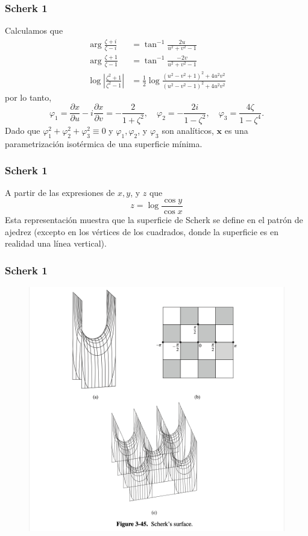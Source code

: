 \documentclass[10pt]{beamer}
\begin{document}
\begin{frame}
  \frametitle{Scherk 1}

Calculamos que
$$
\begin{aligned}
\arg \frac{\zeta+i}{\zeta-i} & =\tan ^{-1} \frac{2 u}{u^2+v^2-1} \\
\arg \frac{\zeta+1}{\zeta-1} & =\tan ^{-1} \frac{-2 v}{u^2+v^2-1} \\
\log \left|\frac{\zeta^2+1}{\zeta^2-1}\right| & =\frac{1}{2} \log \frac{\left(u^2-v^2+1\right)^2+4 u^2 v^2}{\left(u^2-v^2-1\right)^2+4 u^2 v^2}
\end{aligned}
$$
por lo tanto,
$$
\varphi_1=\frac{\partial x}{\partial u}-i \frac{\partial x}{\partial v}=-\frac{2}{1+\zeta^2}, \quad \varphi_2=-\frac{2 i}{1-\zeta^2}, \quad \varphi_3=\frac{4 \zeta}{1-\zeta^4} .
$$
Dado que $\varphi_1^2+\varphi_2^2+\varphi_3^2 \equiv 0$ y $\varphi_1, \varphi_2$, y $\varphi_3$ son analíticos, $\mathbf{x}$ es una parametrización isotérmica de una superficie mínima.

\end{frame}
\begin{frame}
  \frametitle{Scherk 1}

  A partir de las expresiones de $x, y$, y $z$ que
$$
z=\log \frac{\cos y}{\cos x}
$$
Esta representación muestra que la superficie de Scherk se define en el patrón de ajedrez (excepto en los vértices de los cuadrados, donde la superficie es en realidad una línea vertical).

\end{frame}


\begin{frame}
  \frametitle{Scherk 1}
\begin{figure}
  \includegraphics[scale=0.25]{imagenes/7.png}
\end{figure}

\end{frame}
\end{document}
